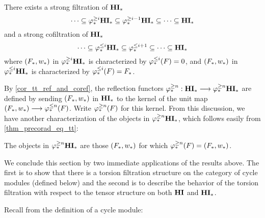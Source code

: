 \begin{cor}
There exists a strong filtration of $\mathbf{HI}_*$
\[
\cdots \subseteq \varphi^{\geq i}_{*}\mathbf{HI}_* \subseteq \varphi^{\geq i - 1}_{*}\mathbf{HI}_* \subseteq 
   \cdots \subseteq \mathbf{HI}_*
\]
and a strong cofiltration of $\mathbf{HI}_*$
\[
\cdots \subseteq \varphi^{\leq i}_{*}\mathbf{HI}_* \subseteq \varphi^{\leq i + 1}_{*} \subseteq 
   \cdots \subseteq \mathbf{HI}_*
\]
where $(F_*, w_*)$ in $\varphi^{\geq i}_{*}\mathbf{HI}_*$ is characterized by
$\varphi^{\leq i}_{*}(F) = 0$, and $(F_*, w_*)$ in $\varphi^{\leq i}_{*}\mathbf{HI}_*$ is
characterized by $\varphi^{\leq i}_{*}(F) = F_*$.
\end{cor}
\noproof

By \ref{cor_tt_ref_and_coref}, the reflection functors 
$\varphi^{\geq n}_{*} : \mathbf{HI}_* \longrightarrow \varphi^{\geq n}_{*}\mathbf{HI}_*$ are defined by sending $(F_*, 
w_*)$ in $\mathbf{HI}_*$ to the kernel of the unit map 
$(F_*, w_*) \longrightarrow \varphi^{\leq n}_{*}(F)$. Write $\varphi^{\geq n}_{*}(F)$ for this 
kernel. From this discussion, we have another characterization of 
the objects in $\varphi^{\geq n}_{*}\mathbf{HI}_*$, which follows easily from 
\ref{thm_precorad_eq_tt}:

\begin{cor}\label{cor_tgHM_prop}
The objects in $\varphi^{\geq n}_{*}\mathbf{HI}_*$ are those $(F_*, w_*)$ for
which $\varphi^{\geq n}_{*}(F) = (F_*, w_*)$.
\end{cor}
\noproof

We conclude this section by two immediate applications of the
results above. The first is to show that there is a torsion 
filtration structure on the category of cycle modules (defined 
below) and the second is to describe the behavior of the torsion
filtration with respect to the tensor structure on both $\mathbf{HI}$
and $\mathbf{HI}_*$.

Recall from \cite{Rost96} the definition of a cycle module:

